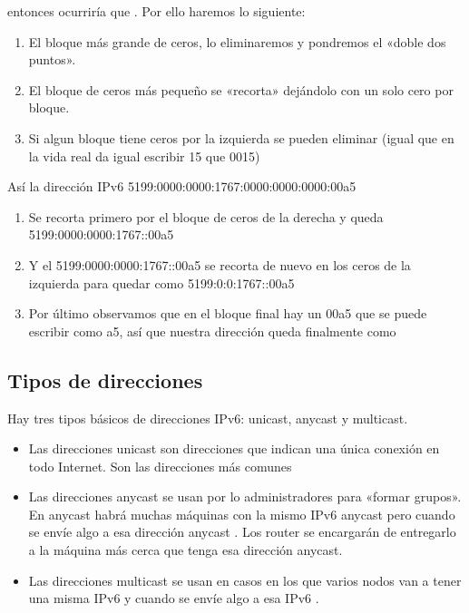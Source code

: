 \documentclass[letterpaper,10pt,spanish]{sphinxmanual}
\begin{document}
entonces ocurriría que . Por ello haremos lo siguiente:
\begin{enumerate}
%
\item {} 
El bloque más grande de ceros, lo eliminaremos y pondremos el «doble dos puntos».

\item {} 
El bloque de ceros más pequeño se «recorta» dejándolo con un solo cero por bloque.

\item {} 
Si algun bloque tiene ceros por la izquierda se pueden eliminar (igual que en la vida real da igual escribir 15 que 0015)

\end{enumerate}

Así la dirección IPv6 5199:0000:0000:1767:0000:0000:0000:00a5
\begin{enumerate}
%
\item {} 
Se recorta primero por el bloque de ceros de la derecha y queda 5199:0000:0000:1767::00a5

\item {} 
Y el 5199:0000:0000:1767::00a5 se recorta de nuevo en los ceros de la izquierda para quedar como 5199:0:0:1767::00a5

\item {} 
Por último observamos que en el bloque final hay un 00a5 que se puede escribir como a5, así que nuestra dirección queda finalmente como 

\end{enumerate}


\subsection{Tipos de direcciones}
\label{\detokenize{t2_integracion_elementos/apuntes_t2:tipos-de-direcciones}}
Hay tres tipos básicos de direcciones IPv6: unicast, anycast y multicast.
\begin{itemize}
\item {} 
Las direcciones unicast son direcciones que indican una única conexión en todo Internet. Son las direcciones más comunes

\item {} 
Las direcciones anycast se usan por lo administradores para «formar grupos». En anycast habrá muchas máquinas con la mismo IPv6 anycast pero cuando se envíe algo a esa dirección anycast . Los router se encargarán de entregarlo a la máquina más cerca que tenga esa dirección anycast.

\item {} 
Las direcciones multicast se usan en casos en los que varios nodos van a tener una misma IPv6 y cuando se envíe algo a esa IPv6 .

\end{itemize}
\end{document}
